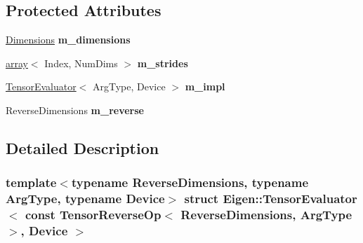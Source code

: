 \subsection*{Protected Attributes}
\begin{DoxyCompactItemize}
\item 
\mbox{\label{struct_eigen_1_1_tensor_evaluator_3_01const_01_tensor_reverse_op_3_01_reverse_dimensions_00_01_arg_type_01_4_00_01_device_01_4_a2dfdcabba27e7756a39ac6bd3a09b86b}} 
\hyperlink{struct_eigen_1_1_d_sizes}{Dimensions} {\bfseries m\+\_\+dimensions}
\item 
\mbox{\label{struct_eigen_1_1_tensor_evaluator_3_01const_01_tensor_reverse_op_3_01_reverse_dimensions_00_01_arg_type_01_4_00_01_device_01_4_a3e407ac3c96ec650073ae16ae1ea9412}} 
\hyperlink{class_eigen_1_1array}{array}$<$ Index, Num\+Dims $>$ {\bfseries m\+\_\+strides}
\item 
\mbox{\label{struct_eigen_1_1_tensor_evaluator_3_01const_01_tensor_reverse_op_3_01_reverse_dimensions_00_01_arg_type_01_4_00_01_device_01_4_af59f27241dacc2f18a8ad48a0eab9e25}} 
\hyperlink{struct_eigen_1_1_tensor_evaluator}{Tensor\+Evaluator}$<$ Arg\+Type, Device $>$ {\bfseries m\+\_\+impl}
\item 
\mbox{\label{struct_eigen_1_1_tensor_evaluator_3_01const_01_tensor_reverse_op_3_01_reverse_dimensions_00_01_arg_type_01_4_00_01_device_01_4_ae902e431eb958b131a9fb7c77ee36a55}} 
Reverse\+Dimensions {\bfseries m\+\_\+reverse}
\end{DoxyCompactItemize}


\subsection{Detailed Description}
\subsubsection*{template$<$typename Reverse\+Dimensions, typename Arg\+Type, typename Device$>$\newline
struct Eigen\+::\+Tensor\+Evaluator$<$ const Tensor\+Reverse\+Op$<$ Reverse\+Dimensions, Arg\+Type $>$, Device $>$}



